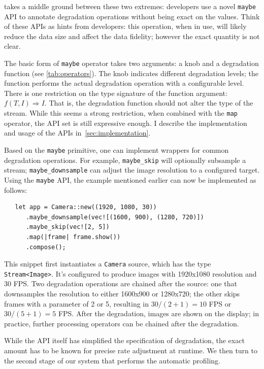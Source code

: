 \sysname{} takes a middle ground between these two extremes: developers use a
novel \texttt{maybe} API to annotate degradation operations without being exact
on the values. Think of these APIs as hints from developers: this operation,
when in use, will likely reduce the data size and affect the data fidelity;
however the exact quantity is not clear.

The basic form of \texttt{maybe} operator takes two arguments: a knob and a
degradation function (see \autoref{tab:operators}). The knob indicates different
degradation levels; the function performs the actual degradation operation with
a configurable level. There is one restriction on the type signature of the
function argument: $f(T, I) \Rightarrow I$. That is, the degradation function
should not alter the type of the stream. While this seems a strong restriction,
when combined with the \texttt{map} operator, the API set is still expressive
enough. I describe the implementation and usage of the APIs
in~\autoref{sec:implementation}.

Based on the \texttt{maybe} primitive, one can implement wrappers for common
degradation operations. For example, \texttt{maybe\_skip} will optionally
subsample a stream; \texttt{maybe\_downsample} can adjust the image resolution
to a configured target. Using the \texttt{maybe} API, the example mentioned
earlier can now be implemented as follows:

\begin{lstlisting}
   let app = Camera::new((1920, 1080, 30))
      .maybe_downsample(vec![(1600, 900), (1280, 720)])
      .maybe_skip(vec![2, 5])
      .map(|frame| frame.show())
      .compose();
\end{lstlisting}

This snippet first instantiates a \texttt{Camera} source, which has the type
\texttt{Stream<Image>}. It's configured to produce images with 1920x1080
resolution and 30 FPS. Two degradation operations are chained after the source:
one that downsamples the resolution to either 1600x900 or 1280x720; the other
skips frames with a parameter of 2 or 5, resulting in $30 / (2+1) = 10$ FPS or
$30/(5+1) = 5$ FPS. After the degradation, images are shown on the display; in
practice, further processing operators can be chained after the degradation.

While the API itself has simplified the specification of degradation, the exact
amount has to be known for precise rate adjustment at runtime. We then turn to
the second stage of our system that performs the automatic profiling.

